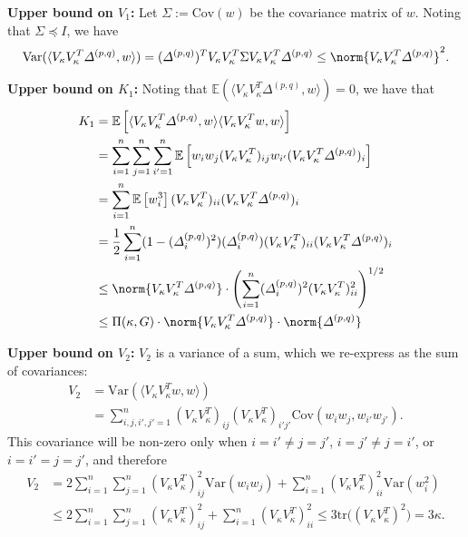 \documentclass{article}
\newcommand{\Var}{\mathrm{Var}}
\newcommand{\Cov}{\mathrm{Cov}}
\newcommand{\1}{\mathbf{1}}
\newcommand{\vardeltapq}{\varDelta^{(p,q)}}
\newcommand{\Ebb}{\mathbb{E}}
\newcommand{\dotp}[2]{\langle #1, #2 \rangle}
\theoremstyle{alden}
\theoremstyle{aldenthm}
\theoremstyle{definition}
\theoremstyle{remark}
\begin{document}
\textbf{Upper bound on $V_1$:}
Let $\Sigma := \Cov(w)$ be the covariance matrix of $w$. Noting that $\Sigma \preceq I$, we have
\begin{equation}
\label{eqn:var1}
\Var(\dotp{V_{\kappa}V_{\kappa}^T\vardeltapq}{w}) =(\vardeltapq)^T V_{\kappa}V_{\kappa}^T \Sigma V_{\kappa}V_{\kappa}^T \vardeltapq \leq \norm{V_{\kappa}V_{\kappa}^T\vardeltapq}^2.
\end{equation}

\textbf{Upper bound on $K_1$:}
Noting that $\Ebb(\dotp{V_{\kappa}V_{\kappa}^T \vardeltapq}{w}) = 0$, we have that
\begin{align}
K_1 & = \Ebb\left[\dotp{V_{\kappa}V_{\kappa}^T \vardeltapq}{w} \dotp{V_{\kappa}V_{\kappa}^T w}{w}\right] \nonumber \\
& = \sum_{i = 1}^{n} \sum_{j = 1}^{n} \sum_{i' = 1}^{n} \Ebb\left[w_i w_j (V_{\kappa}V_{\kappa}^T)_{ij} w_{i'} (V_{\kappa}V_{\kappa}^T\vardeltapq)_i\right] \nonumber \\
& = \sum_{i = 1}^{n} \Ebb\left[w_i^3\right] (V_{\kappa}V_{\kappa}^T)_{ii} (V_{\kappa}V_{\kappa}^T \vardeltapq)_i \nonumber \\
& = \frac{1}{2}\sum_{i = 1}^{n} (1 - (\vardeltapq_{i})^2)(\vardeltapq_{i}) (V_{\kappa} V_{\kappa}^T)_{ii}  (V_{\kappa}V_{\kappa}^T\vardeltapq)_i \nonumber \\
& \leq \norm{V_{\kappa}V_{\kappa}^T \vardeltapq} \cdot \left(\sum_{i = 1}^{n} (\vardeltapq_{i})^2 (V_{\kappa} V_{\kappa}^T)_{ii}^2\right)^{1/2} \nonumber \\
& \leq \Pi(\kappa,G) \cdot \norm{V_{\kappa}V_{\kappa}^T \vardeltapq} \cdot \norm{\vardeltapq}  \label{eqn:var2} 
\end{align}

\textbf{Upper bound on $V_2$:}
$V_2$ is a variance of a sum, which we re-express as the sum of covariances:
\begin{align*}
V_2 & = \Var(\dotp{V_{\kappa}V_{\kappa}^T w}{w}) \\
& = \sum_{i,j,i',j' = 1}^{n} (V_{\kappa}V_{\kappa}^T)_{ij} (V_{\kappa}V_{\kappa}^T)_{i'j'} \Cov(w_i w_j, w_{i'} w_{j'}).
\end{align*}
This covariance will be non-zero only when $i = i' \neq j = j'$, $i = j' \neq j = i'$, or $i = i' = j = j'$, and therefore
\begin{align}
V_2 & = 2\sum_{i = 1}^{n}\sum_{j = 1}^{n} (V_{\kappa}V_{\kappa}^T)_{ij}^2 \Var(w_iw_j) + \sum_{i = 1}^{n} (V_{\kappa}V_{\kappa}^T)_{ii}^2 \Var(w_i^2) \nonumber\\
& \leq 2\sum_{i = 1}^{n}\sum_{j = 1}^{n} (V_{\kappa}V_{\kappa}^T)_{ij}^2 + \sum_{i = 1}^{n} (V_{\kappa}V_{\kappa}^T)_{ii}^2 \leq 3 \mathrm{tr}\bigl((V_{\kappa}V_{\kappa}^T)^2\bigr) = 3\kappa. \label{eqn:var3}
\end{align}
\end{document}
